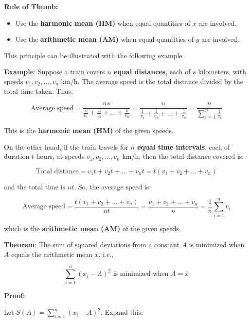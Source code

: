 \documentclass[twoside]{book}
\begin{document}
\medskip

\noindent
\textbf{Rule of Thumb:}
\begin{itemize}
    \item Use the \textbf{harmonic mean (HM)} when equal quantities of $x$ are involved.
    \item Use the \textbf{arithmetic mean (AM)} when equal quantities of $y$ are involved.
\end{itemize}

\medskip

This principle can be illustrated with the following example.

\textbf{Example}: Suppose a train covers \textbf{\( n \) equal distances}, each of \( s \) kilometers, with speeds \( v_1, v_2, \dots, v_n \) km/h. The average speed is the total distance divided by the total time taken. Thus,

\[
\text{Average speed} = \frac{ns}{\frac{s}{v_1} + \frac{s}{v_2} + \dots + \frac{s}{v_n}} 
= \frac{n}{\frac{1}{v_1} + \frac{1}{v_2} + \dots + \frac{1}{v_n}} 
= \frac{n}{\sum_{i=1}^n \frac{1}{v_i}}
\]

This is the \textbf{harmonic mean (HM)} of the given speeds.

\medskip

On the other hand, if the train travels for \textbf{\( n \) equal time intervals}, each of duration \( t \) hours, at speeds \( v_1, v_2, \dots, v_n \) km/h, then the total distance covered is:

\[
\text{Total distance} = v_1t + v_2t + \dots + v_nt = t(v_1 + v_2 + \dots + v_n)
\]

and the total time is \( nt \). So, the average speed is:

\[
\text{Average speed} = \frac{t(v_1 + v_2 + \dots + v_n)}{nt} = \frac{v_1 + v_2 + \dots + v_n}{n} 
= \frac{1}{n} \sum_{i=1}^n v_i
\]

which is the \textbf{arithmetic mean (AM)} of the given speeds.


\begin{textbox}
    \textbf{Theorem}: The sum of squared deviations from a constant \( A \) is minimized when \( A \) equals the arithmetic mean \( \overline{x} \), i.e.,

\[
\sum_{i=1}^n (x_i - A)^2 \text{ is minimized when } A = \overline{x}
\]
\end{textbox}

\textbf{Proof:}

Let \( S(A) = \sum_{i=1}^n (x_i - A)^2 \). Expand this:
\end{document}
